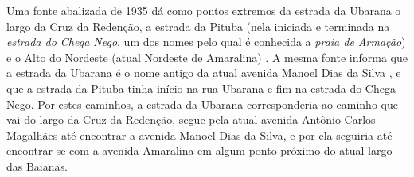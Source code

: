 Uma fonte abalizada de 1935 dá como pontos extremos da estrada da Ubarana o largo da Cruz da Redenção, a estrada da Pituba (nela iniciada e terminada na \textit{estrada do Chega Nego}, um dos nomes pelo qual é conhecida a \textit{praia de Armação}) e o Alto do Nordeste (atual Nordeste de Amaralina) \cite[pp.~41, 42, 97]{souza_guia_1935}. A mesma fonte informa que a estrada da Ubarana é o nome antigo da atual avenida Manoel Dias da Silva \cite[p.~85]{souza_guia_1935}, e que a estrada da Pituba tinha início na rua Ubarana e fim na estrada do Chega Nego. Por estes caminhos, a estrada da Ubarana corresponderia ao caminho que vai do largo da Cruz da Redenção, segue pela atual avenida Antônio Carlos Magalhães até encontrar a avenida Manoel Dias da Silva, e por ela seguiria até encontrar-se com a avenida Amaralina em algum ponto próximo do atual largo das Baianas.

